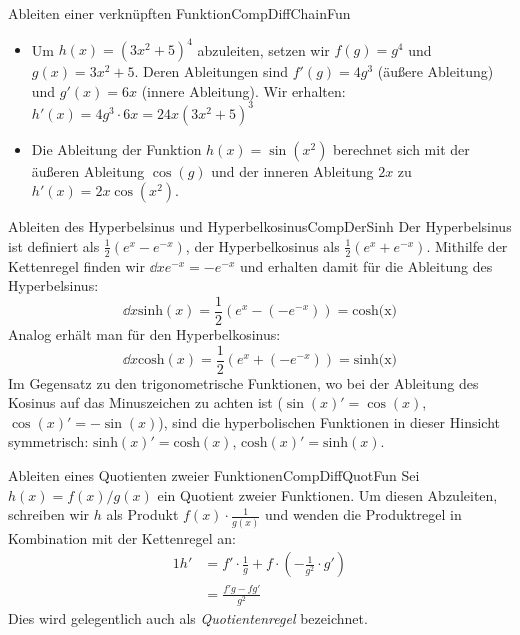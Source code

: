 \begin{example}{Ableiten einer verknüpften Funktion}{CompDiffChainFun}
    \begin{itemize}
        \item Um $h(x) = (3x^2+5)^4$ abzuleiten, setzen wir $f(g) = g^4$ und $g(x) = 3x^2+5$. Deren Ableitungen sind $f'(g) = 4g^3$ (äußere Ableitung) und $g'(x) = 6x$ (innere Ableitung). Wir erhalten: $h'(x) = 4g^3 \cdot 6x = 24x(3x^2+5)^3$
        \item Die Ableitung der Funktion $h(x) = \sin(x^2)$ berechnet sich mit der äußeren Ableitung $\cos(g)$ und der inneren Ableitung $2x$ zu $h'(x) = 2x\cos(x^2)$.
    \end{itemize}
\end{example}

\begin{example}{Ableiten des Hyperbelsinus und Hyperbelkosinus}{CompDerSinh}
    Der Hyperbelsinus ist definiert als $\frac{1}{2} (e^x - e^{-x})$, der Hyperbelkosinus als $\frac{1}{2} (e^x + e^{-x})$. Mithilfe der Kettenregel finden wir $\dd{}{x}e^{-x} = -e^{-x}$ und erhalten damit für die Ableitung des Hyperbelsinus:
    $$
        \dd{}{x} \text{sinh}(x) = \frac{1}{2} (e^x-(-e^{-x})) = \text{cosh(x)}
    $$
    Analog erhält man für den Hyperbelkosinus:
    $$
        \dd{}{x} \text{cosh}(x) = \frac{1}{2} (e^x+(-e^{-x})) = \text{sinh(x)}
    $$
    Im Gegensatz zu den trigonometrische Funktionen, wo bei der Ableitung des Kosinus auf das Minuszeichen zu achten ist ($\sin(x)' = \cos(x)$, $\cos(x)' = -\sin(x)$), sind die hyperbolischen Funktionen in dieser Hinsicht symmetrisch: $\text{sinh}(x)' = \text{cosh}(x)$, $\text{cosh}(x)' = \text{sinh}(x)$.
\end{example}

\begin{example}{Ableiten eines Quotienten zweier Funktionen}{CompDiffQuotFun}
    Sei $h(x) = f(x) / g(x)$ ein Quotient zweier Funktionen. Um diesen Abzuleiten, schreiben wir $h$ als Produkt $f(x) \cdot \frac{1}{g(x)}$ und wenden die Produktregel in Kombination mit der Kettenregel an:
    \begin{alignat*}{1}
        h' &= f' \cdot \frac{1}{g} + f \cdot \left(-\frac{1}{g^2} \cdot g'\right) \\
           &= \frac{f'g - fg'}{g^2}
    \end{alignat*}
    Dies wird gelegentlich auch als \emph{Quotientenregel} bezeichnet.
\end{example}

